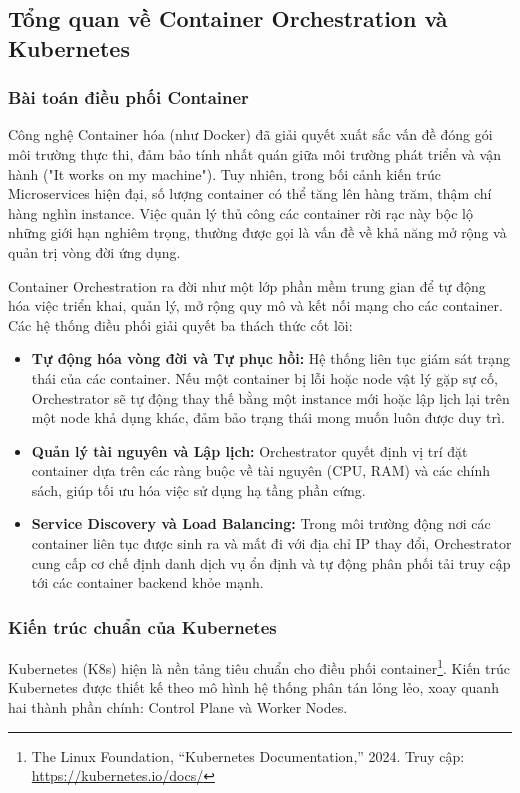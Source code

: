 \subsection{Tổng quan về Container Orchestration và Kubernetes}

\subsubsection{Bài toán điều phối Container }
Công nghệ Container hóa (như Docker) đã giải quyết xuất sắc vấn đề đóng gói môi trường thực thi, đảm bảo tính nhất quán giữa môi trường phát triển và vận hành ("It works on my machine"). Tuy nhiên, trong bối cảnh kiến trúc Microservices hiện đại, số lượng container có thể tăng lên hàng trăm, thậm chí hàng nghìn instance. Việc quản lý thủ công các container rời rạc này bộc lộ những giới hạn nghiêm trọng, thường được gọi là vấn đề về khả năng mở rộng và quản trị vòng đời ứng dụng.

Container Orchestration ra đời như một lớp phần mềm trung gian để tự động hóa việc triển khai, quản lý, mở rộng quy mô và kết nối mạng cho các container. Các hệ thống điều phối giải quyết ba thách thức cốt lõi:
\begin{itemize}
    \item \textbf{Tự động hóa vòng đời và Tự phục hồi:} Hệ thống liên tục giám sát trạng thái của các container. Nếu một container bị lỗi hoặc node vật lý gặp sự cố, Orchestrator sẽ tự động thay thế bằng một instance mới hoặc lập lịch lại trên một node khả dụng khác, đảm bảo trạng thái mong muốn luôn được duy trì.
    \item \textbf{Quản lý tài nguyên và Lập lịch:} Orchestrator quyết định vị trí đặt container dựa trên các ràng buộc về tài nguyên (CPU, RAM) và các chính sách, giúp tối ưu hóa việc sử dụng hạ tầng phần cứng.
    \item \textbf{Service Discovery và Load Balancing:} Trong môi trường động nơi các container liên tục được sinh ra và mất đi với địa chỉ IP thay đổi, Orchestrator cung cấp cơ chế định danh dịch vụ ổn định và tự động phân phối tải truy cập tới các container backend khỏe mạnh.
\end{itemize}

\subsubsection{Kiến trúc chuẩn của Kubernetes}
Kubernetes (K8s) hiện là nền tảng tiêu chuẩn cho điều phối container\footnote{The Linux Foundation, ``Kubernetes Documentation,'' 2024. Truy cập: \url{https://kubernetes.io/docs/}}. Kiến trúc Kubernetes được thiết kế theo mô hình hệ thống phân tán lỏng lẻo, xoay quanh hai thành phần chính: Control Plane và Worker Nodes.

